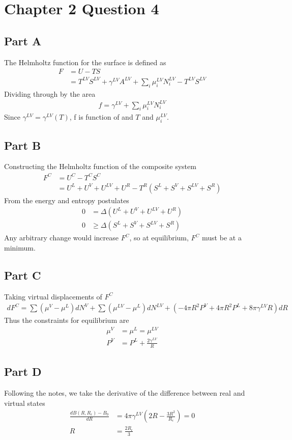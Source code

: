 \documentclass{article}
\begin{document}
\section*{Chapter 2 Question 4}
\subsection*{Part A}
The Helmholtz function for the surface is defined as
\begin{align*}
F&=U-TS \\
&=T^{LV}S^{LV}+\gamma^{LV} A^{LV} + \sum_i \mu_i^{LV} N_i^{LV}-T^{LV}S^{LV}
\end{align*}
Dividing through by the area
\begin{align*}
f=\gamma^{LV} +\sum_i \mu_i^{LV} N_i^{LV}
\end{align*}
Since $\gamma^{LV}=\gamma^{LV}(T)$, f is function of and $T$ and $\mu_i^{LV}$.

\subsection*{Part B}
Constructing the Helmholtz function of the composite system
\begin{align*}
F^C&=U^C-T^CS^C\\
&=U^L+U^V+U^{LV}+U^R-T^R(S^L+S^V+S^{LV}+S^R)
\end{align*}
From the energy and entropy postulates
\begin{align*}
0&=\Delta(U^L+U^V+U^{LV}+U^R)\\
0&\ge \Delta(S^L+S^V+S^{LV}+S^R)
\end{align*}
Any arbitrary change would increase $F^{C}$, so at equilibrium, $F^{C}$ must be at a minimum.

\subsection*{Part C}
Taking virtual displacements of $F^C$
\begin{align*}
dF^C=\sum(\mu^V-\mu^L)dN^V+\sum(\mu^{LV}-\mu^L)dN^{LV}+(-4\pi R^2P^V+4\pi R^2P^L+8\pi\gamma^{LV}R)dR
\end{align*}
Thus the constraints for equilibrium are
\begin{align*}
\mu^V&=\mu^L=\mu^{LV}\\
P^V &=P^L +\frac{2\gamma^{LV}}{R}
\end{align*}

\subsection*{Part D}
Following the notes, we take the derivative of the difference between real and virtual states\begin{align*}
\frac{dB(R,R_{\epsilon})-B_0}{dR}&=4\pi\gamma^{LV}(2R-\frac{3R^2}{R_{\epsilon}})=0\\
R&=\frac{2R_{\epsilon}}{3}
\end{align*}
\end{document}
